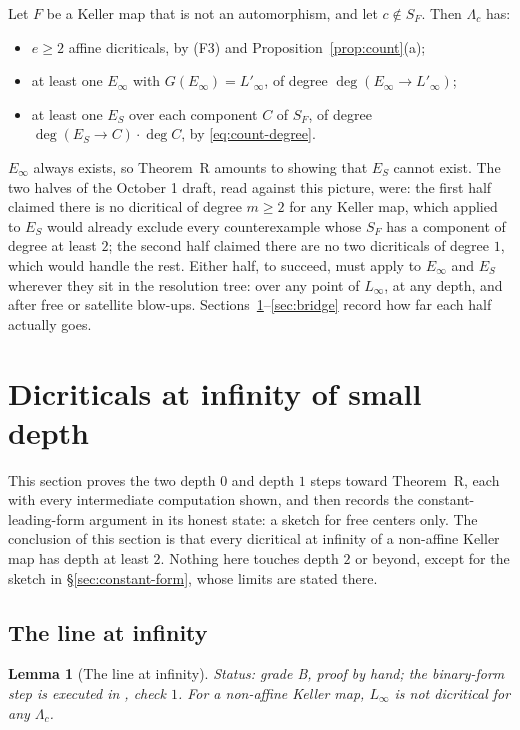 \documentclass[a4paper,11pt]{article}
\newcommand{\filename}[1]{\texttt{\seqsplit{#1}}}
\theoremstyle{plain}
\newtheorem{lemma}[theorem]{Lemma}
\theoremstyle{definition}
\theoremstyle{remark}
\begin{document}
Let $F$ be a Keller map that is not an automorphism, and let $c \notin S_F$. Then
$\Lambda_c$ has:
\begin{itemize}[nosep]
\item $e \geq 2$ affine dicriticals, by (F3) and Proposition~\ref{prop:count}(a);
\item at least one $E_\infty$ with $G(E_\infty) = L'_\infty$, of degree
$\deg(E_\infty \to L'_\infty)$;
\item at least one $E_S$ over each component $C$ of $S_F$, of degree
$\deg(E_S \to C) \cdot \deg C$, by \eqref{eq:count-degree}.
\end{itemize}
$E_\infty$ always exists, so Theorem~R amounts to showing that $E_S$ cannot exist. The two
halves of the October 1 draft, read against this picture, were: the first half claimed there
is no dicritical of degree $m \geq 2$ for any Keller map, which applied to $E_S$ would
already exclude every counterexample whose $S_F$ has a component of degree at least $2$; the
second half claimed there are no two dicriticals of degree $1$, which would handle the rest.
Either half, to succeed, must apply to $E_\infty$ and $E_S$ wherever they sit in the
resolution tree: over any point of $L_\infty$, at any depth, and after free or satellite
blow-ups. Sections~\ref{sec:depth01}--\ref{sec:bridge} record how far each half actually goes.

\section{Dicriticals at infinity of small depth}\label{sec:depth01}

This section proves the two depth $0$ and depth $1$ steps toward Theorem~R, each with every
intermediate computation shown, and then records the constant-leading-form argument in its
honest state: a sketch for free centers only. The conclusion of this section is that every
dicritical at infinity of a non-affine Keller map has depth at least $2$. Nothing here touches
depth $2$ or beyond, except for the sketch in \S\ref{sec:constant-form}, whose limits are
stated there.

\subsection{The line at infinity}\label{sec:linf}

\begin{lemma}[The line at infinity]\label{lem:linf}
\textit{Status: grade B, proof by hand; the binary-form step is executed in
\filename{base\_point\_at\_infinity\_check.py}, check $1$.}
For a non-affine Keller map, $L_\infty$ is not dicritical for any $\Lambda_c$.
\end{lemma}
\end{document}
